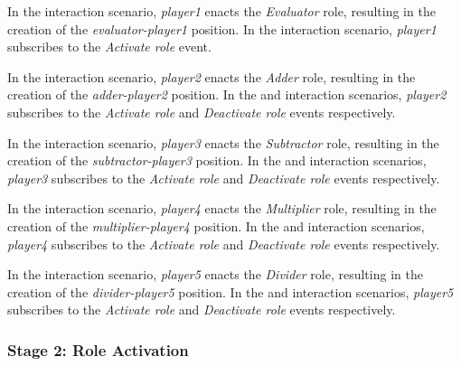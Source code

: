 In the {} interaction scenario, \textit{player1} enacts the \textit{Evaluator} role, resulting in the creation of the \textit{evaluator-player1} position.
In the {} interaction scenario, \textit{player1} subscribes to the \textit{Activate role} event.

In the {} interaction scenario, \textit{player2} enacts the \textit{Adder} role, resulting in the creation of the \textit{adder-player2} position.
In the {} and {} interaction scenarios, \textit{player2} subscribes to the \textit{Activate role} and \textit{Deactivate role} events respectively.

In the {} interaction scenario, \textit{player3} enacts the \textit{Subtractor} role, resulting in the creation of the \textit{subtractor-player3} position.
In the {} and {} interaction scenarios, \textit{player3} subscribes to the \textit{Activate role} and \textit{Deactivate role} events respectively.

In the {} interaction scenario, \textit{player4} enacts the \textit{Multiplier} role, resulting in the creation of the \textit{multiplier-player4} position.
In the {} and {} interaction scenarios, \textit{player4} subscribes to the \textit{Activate role} and \textit{Deactivate role} events respectively.

In the {} interaction scenario, \textit{player5} enacts the \textit{Divider} role, resulting in the creation of the \textit{divider-player5} position.
In the {} and {} interaction scenarios, \textit{player5} subscribes to the \textit{Activate role} and \textit{Deactivate role} events respectively.

\subsubsection*{Stage 2: Role Activation}

